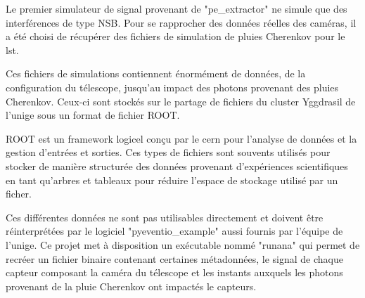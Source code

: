 Le premier simulateur de signal provenant de "pe\_extractor" ne simule que des interférences de type NSB. 
Pour se rapprocher des données réelles des caméras, il a été choisi de récupérer des fichiers de simulation de pluies Cherenkov pour le \gls{lst}.

Ces fichiers de simulations contiennent énormément de données, de la configuration du télescope, jusqu'au impact des photons provenant des pluies Cherenkov.
Ceux-ci sont stockés sur le partage de fichiers du cluster Yggdrasil de l'\gls{unige} sous un format de fichier ROOT. 

ROOT est un framework logicel conçu par le \gls{cern} pour l'analyse de données et la gestion d'entrées et sorties. Ces types de fichiers
sont souvents utilisés pour stocker de manière structurée des données provenant d'expériences scientifiques en tant qu'arbres et tableaux
pour réduire l'espace de stockage utilisé par un ficher.

Ces différentes données ne sont pas utilisables directement et doivent être réinterprétées par le logiciel "pyeventio\_example" aussi fournis
par l'équipe de l'\gls{unige}. Ce projet met à disposition un exécutable nommé "runana" qui permet de recréer un fichier binaire 
contenant certaines métadonnées, le signal de chaque capteur composant la caméra du télescope et les instants auxquels les photons 
provenant de la pluie Cherenkov ont impactés le capteurs.

